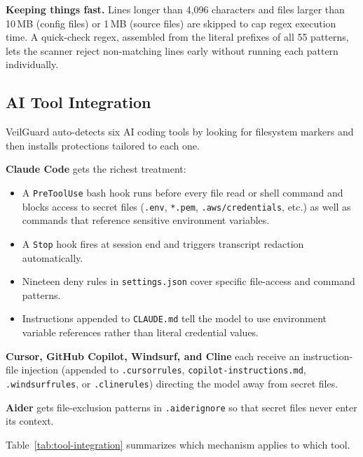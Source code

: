 \documentclass[conference]{IEEEtran}
\begin{document}
\textbf{Keeping things fast.} Lines longer than 4{,}096 characters and files
larger than 10\,MB (config files) or 1\,MB (source files) are skipped to cap
regex execution time. A quick-check regex, assembled from the literal prefixes
of all 55 patterns, lets the scanner reject non-matching lines early without
running each pattern individually.

\subsection{AI Tool Integration}
\label{sec:integration}

VeilGuard auto-detects six AI coding tools by looking for filesystem markers
and then installs protections tailored to each one.

\textbf{Claude Code} gets the richest treatment:

\begin{itemize}
  \item A \texttt{PreToolUse} bash hook runs before every file read or shell
        command and blocks access to secret files (\texttt{.env},
        \texttt{*.pem}, \texttt{.aws/credentials}, etc.) as well as commands
        that reference sensitive environment variables.
  \item A \texttt{Stop} hook fires at session end and triggers transcript
        redaction automatically.
  \item Nineteen deny rules in \texttt{settings.json} cover specific
        file-access and command patterns.
  \item Instructions appended to \texttt{CLAUDE.md} tell the model to use
        environment variable references rather than literal credential values.
\end{itemize}

\textbf{Cursor, GitHub Copilot, Windsurf, and Cline} each receive an
instruction-file injection (appended to \texttt{.cursorrules},
\texttt{copilot-instructions.md}, \texttt{.windsurfrules}, or
\texttt{.clinerules}) directing the model away from secret files.

\textbf{Aider} gets file-exclusion patterns in \texttt{.aiderignore} so that
secret files never enter its context.

Table~\ref{tab:tool-integration} summarizes which mechanism applies to which
tool.
\end{document}
